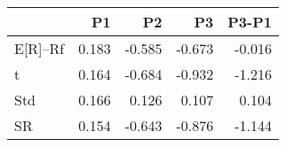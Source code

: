 \begin{tabular}{lrrrr}
\toprule
 & P1 & P2 & P3 & P3-P1 \\
\midrule
E[R]--Rf & 0.183 & -0.585 & -0.673 & -0.016 \\
t & 0.164 & -0.684 & -0.932 & -1.216 \\
Std & 0.166 & 0.126 & 0.107 & 0.104 \\
SR & 0.154 & -0.643 & -0.876 & -1.144 \\
\bottomrule
\end{tabular}
